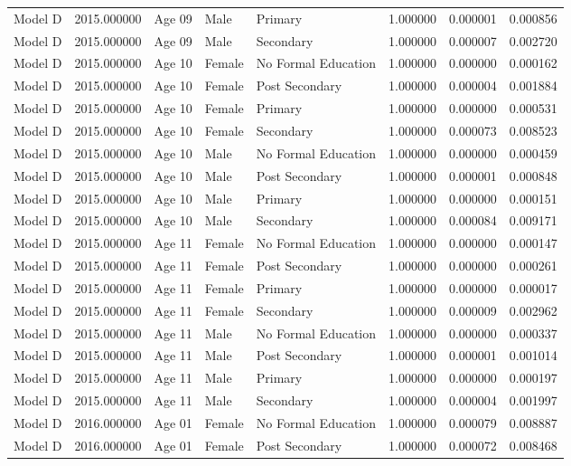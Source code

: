 \begin{table}[ht]
\begin{tabular}{lrlllrrr}
Model D & 2015.000000 & Age 09 & Male & Primary & 1.000000 & 0.000001 & 0.000856 \\
Model D & 2015.000000 & Age 09 & Male & Secondary & 1.000000 & 0.000007 & 0.002720 \\
Model D & 2015.000000 & Age 10 & Female & No Formal Education & 1.000000 & 0.000000 & 0.000162 \\
Model D & 2015.000000 & Age 10 & Female & Post Secondary & 1.000000 & 0.000004 & 0.001884 \\
Model D & 2015.000000 & Age 10 & Female & Primary & 1.000000 & 0.000000 & 0.000531 \\
Model D & 2015.000000 & Age 10 & Female & Secondary & 1.000000 & 0.000073 & 0.008523 \\
Model D & 2015.000000 & Age 10 & Male & No Formal Education & 1.000000 & 0.000000 & 0.000459 \\
Model D & 2015.000000 & Age 10 & Male & Post Secondary & 1.000000 & 0.000001 & 0.000848 \\
Model D & 2015.000000 & Age 10 & Male & Primary & 1.000000 & 0.000000 & 0.000151 \\
Model D & 2015.000000 & Age 10 & Male & Secondary & 1.000000 & 0.000084 & 0.009171 \\
Model D & 2015.000000 & Age 11 & Female & No Formal Education & 1.000000 & 0.000000 & 0.000147 \\
Model D & 2015.000000 & Age 11 & Female & Post Secondary & 1.000000 & 0.000000 & 0.000261 \\
Model D & 2015.000000 & Age 11 & Female & Primary & 1.000000 & 0.000000 & 0.000017 \\
Model D & 2015.000000 & Age 11 & Female & Secondary & 1.000000 & 0.000009 & 0.002962 \\
Model D & 2015.000000 & Age 11 & Male & No Formal Education & 1.000000 & 0.000000 & 0.000337 \\
Model D & 2015.000000 & Age 11 & Male & Post Secondary & 1.000000 & 0.000001 & 0.001014 \\
Model D & 2015.000000 & Age 11 & Male & Primary & 1.000000 & 0.000000 & 0.000197 \\
Model D & 2015.000000 & Age 11 & Male & Secondary & 1.000000 & 0.000004 & 0.001997 \\
Model D & 2016.000000 & Age 01 & Female & No Formal Education & 1.000000 & 0.000079 & 0.008887 \\
Model D & 2016.000000 & Age 01 & Female & Post Secondary & 1.000000 & 0.000072 & 0.008468 \\

\end{tabular}
\end{table}
